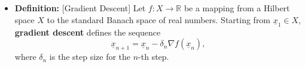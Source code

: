 \documentclass[11pt,twoside]{report}
\newcommand{\bbR}{{\mathbb{R}}}
\newcommand{\vecnot}{\underline}
\begin{document}
\begin{itemize}
%
%
%
%
%
%
%
%
%
%
%
%
%
%
%
%
%
%
%


\item \textbf{Definition:} [Gradient Descent]
Let $f \colon X \rightarrow \bbR$ be a mapping from a Hilbert space $X$ to the standard Banach space of real numbers. Starting from $\vecnot{x}_1 \in X$, \textbf{gradient descent} defines the sequence
\[ \vecnot{x}_{n+1} = \vecnot{x}_n - \delta_n \nabla f(\vecnot{x}_n), \]
where $\delta_n$ is the step size for the $n$-th step.



\end{itemize}
\end{document}
